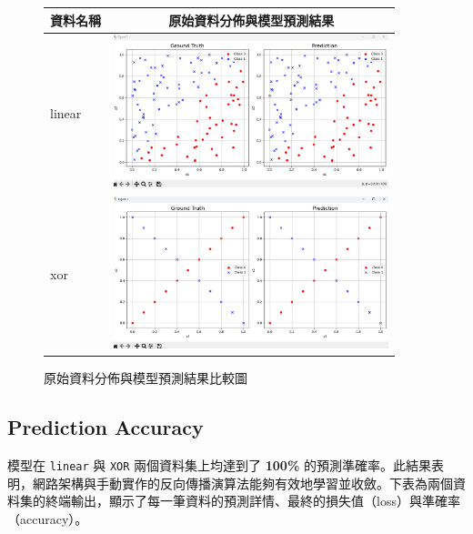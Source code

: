 \documentclass{article}
\begin{document}
\begin{figure}[h]
    \centering
    \renewcommand{\arraystretch}{1.5}  %
    \begin{tabular}{|>{\centering\arraybackslash}m{2cm}|c|}
        \hline
        \textbf{資料名稱} & \textbf{原始資料分佈與模型預測結果} \\
        \hline
        \large linear & \includegraphics[width=8cm]{Lab01_report/img/3.1-linear.png} \\
        \hline
        \large xor & \includegraphics[width=8cm]{Lab01_report/img/3.1-xor.png} \\
        \hline
    \end{tabular}
    \caption{原始資料分佈與模型預測結果比較圖}
    \label{fig:comparison}
\end{figure}


\subsection{Prediction Accuracy}
模型在 \texttt{linear} 與 \texttt{XOR} 兩個資料集上均達到了 \textbf{100\%} 的預測準確率。此結果表明，網路架構與手動實作的反向傳播演算法能夠有效地學習並收斂。下表為兩個資料集的終端輸出，顯示了每一筆資料的預測詳情、最終的損失值（loss）與準確率（accuracy）。
\end{document}
